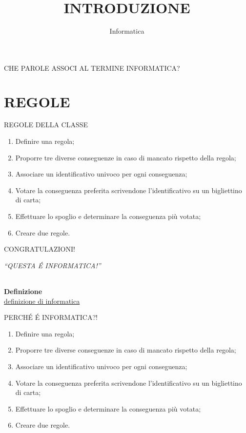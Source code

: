 \documentclass[aspectratio=1610]{beamer}
\title{INTRODUZIONE}
\subtitle{Informatica}
\date{}
\institute{}
\begin{document}
\begin{frame}
    \titlepage
\end{frame}

\begin{frame}{CHE PAROLE ASSOCI AL TERMINE INFORMATICA?}
\end{frame}

\section{REGOLE}

\begin{frame}{REGOLE DELLA CLASSE}
    \begin{enumerate}
        \item Definire una regola;
        \pause
        \item Proporre tre diverse conseguenze in caso di mancato rispetto della regola;
        \pause
        \item Associare un identificativo univoco per ogni conseguenza;
        \pause
        \item Votare la conseguenza preferita scrivendone l'identificativo su un bigliettino di carta;
        \pause
        \item Effettuare lo spoglio e determinare la conseguenza più votata;
        \pause
        \item Creare due regole.
    \end{enumerate}
\end{frame}

\begin{frame}{CONGRATULAZIONI!}
    \begin{minipage}{0.98\linewidth}
        \centering
        \huge
        \textit{``QUESTA \'E INFORMATICA!''}\\
    \end{minipage}\\
    \bigskip
    \tiny{\textbf{Definizione}}\\
    \tiny{\href{https://it.wikipedia.org/wiki/Informatica}{definizione di informatica}}
\end{frame}

\begin{frame}{PERCH\'E \'E INFORMATICA?!}
    \begin{enumerate}
        \item Definire una regola;
        \item Proporre tre diverse conseguenze in caso di mancato rispetto della regola;
        \item Associare un identificativo univoco per ogni conseguenza;
        \item Votare la conseguenza preferita scrivendone l'identificativo su un bigliettino di carta;
        \item Effettuare lo spoglio e determinare la conseguenza più votata;
        \item Creare due regole.
    \end{enumerate}
\end{frame}
\end{document}
